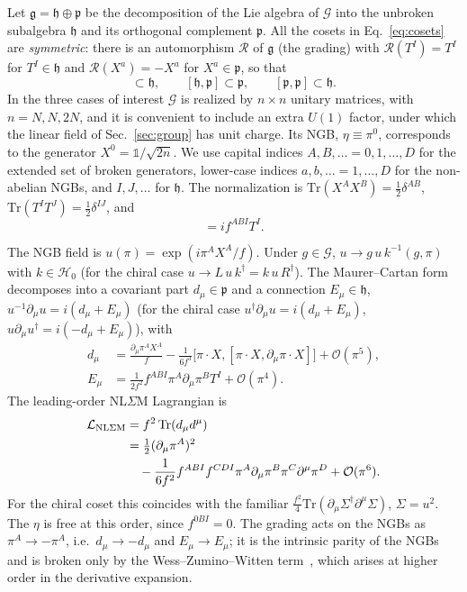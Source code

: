 \documentclass[aps,prd,twocolumn,superscriptaddress,nofootinbib,floatfix]{revtex4-2}
\theoremstyle{remark}
\newcommand{\Tr}{\mathrm{Tr}}
\newcommand{\G}{\mathcal{G}}
\newcommand{\Hg}{\mathcal{H}_0}    %
\newcommand{\p}{\mathfrak{p}}
\newcommand{\h}{\mathfrak{h}}
\newcommand{\ie}{i.e.}
\begin{document}
Let $\mathfrak{g}=\h\oplus\p$ be the decomposition of the Lie algebra of $\G$ into the unbroken subalgebra $\h$ and its orthogonal complement $\p$. All the cosets in Eq.~\eqref{eq:cosets} are \emph{symmetric}: there is an automorphism $\mathcal{R}$ of $\mathfrak g$ (the grading) with $\mathcal{R}(T^I)=T^I$ for $T^I\in\h$ and $\mathcal{R}(X^a)=-X^a$ for $X^a\in\p$, so that
\begin{equation}
[\h,\h]\subset\h,\qquad [\h,\p]\subset\p,\qquad [\p,\p]\subset\h .
\label{eq:symmetric}
\end{equation}
In the three cases of interest $\G$ is realized by $n\times n$ unitary matrices, with $n=N,N,2N$, and it is convenient to include an extra $U(1)$ factor, under which the linear field of Sec.~\ref{sec:group} has unit charge. Its NGB, $\eta\equiv\pi^0$, corresponds to the generator $X^0=\mathbb{1}/\sqrt{2n}$. We use capital indices $A,B,\ldots=0,1,\dots,D$ for the extended set of broken generators, lower-case indices $a,b,\ldots=1,\dots,D$ for the non-abelian NGBs, and $I,J,\ldots$ for $\h$. The normalization is $\Tr(X^AX^B)=\tfrac12\delta^{AB}$, $\Tr(T^IT^J)=\tfrac12\delta^{IJ}$, and
\begin{equation}
[X^A,X^B]=i f^{ABI}T^I .
\label{eq:fdef}
\end{equation}

The NGB field is $u(\pi)=\exp(i\pi^AX^A/f)$. Under $g\in\G$, $u\to g\,u\,k^{-1}(g,\pi)$ with $k\in\Hg$ (for the chiral case $u\to L\,u\,k^\dagger=k\,u\,R^\dagger$). The Maurer--Cartan form decomposes into a covariant part $d_\mu\in\p$ and a connection $E_\mu\in\h$, $u^{-1}\partial_\mu u=i(d_\mu+E_\mu)$ (for the chiral case $u^\dagger\partial_\mu u=i(d_\mu+E_\mu)$, $u\partial_\mu u^\dagger=i(-d_\mu+E_\mu)$), with
\begin{align}
d_\mu &=\frac{\partial_\mu\pi^AX^A}{f}-\frac{1}{6f^3}\big[\pi\!\cdot\! X,[\pi\!\cdot\! X,\partial_\mu\pi\!\cdot\! X]\big]+\mathcal{O}(\pi^5),\nonumber\\
E_\mu &=\frac{1}{2f^2}f^{ABI}\pi^A\partial_\mu\pi^BT^I+\mathcal{O}(\pi^4).
\label{eq:dE}
\end{align}
The leading-order NL$\Sigma$M Lagrangian is
\begin{align}
\mathcal{L}_{\rm NL\Sigma M}&=f^2\,\Tr(d_\mu d^\mu)\nonumber\\
&=\tfrac12(\partial_\mu\pi^A)^2\nonumber\\&\quad-\frac{1}{6f^2}f^{ABI}f^{CDI}\pi^A\partial_\mu\pi^B\pi^C\partial^\mu\pi^D+\mathcal{O}(\pi^6).
\label{eq:LNLSM}
\end{align}
For the chiral coset this coincides with the familiar $\tfrac{f^2}{4}\Tr(\partial_\mu\Sigma^\dagger\partial^\mu\Sigma)$, $\Sigma=u^2$. The $\eta$ is free at this order, since $f^{0BI}=0$. The grading acts on the NGBs as $\pi^A\to-\pi^A$, \ie\ $d_\mu\to-d_\mu$ and $E_\mu\to E_\mu$; it is the intrinsic parity of the NGBs and is broken only by the Wess--Zumino--Witten term~\cite{Wess:1971yu,Witten:1983tw}, which arises at higher order in the derivative expansion.
\end{document}
